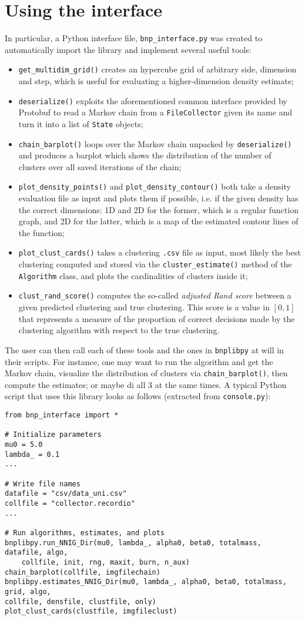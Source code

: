 \section{Using the interface}
In particular, a Python interface file, \verb|bnp_interface.py| was created to automatically import the library and implement several useful tools:
\begin{itemize}
	\item \verb|get_multidim_grid()| creates an hypercube grid of arbitrary side, dimension and step, which is useful for evaluating a higher-dimension density estimate;
	\item \verb|deserialize()| exploits the aforementioned common interface provided by Protobuf to read a Markov chain from a \verb|FileCollector| given its name and turn it into a list of \verb|State| objects;
	\item \verb|chain_barplot()| loops over the Markov chain unpacked by \verb|deserialize()| and produces a barplot which shows the distribution of the number of clusters over all saved iterations of the chain;
	\item \verb|plot_density_points()| and \verb|plot_density_contour()| both take a density evaluation file as input and plots them if possible, i.e. if the given density has the correct dimensions: 1D and 2D for the former, which is a regular function graph, and 2D for the latter, which is a map of the estimated contour lines of the function;
	\item \verb|plot_clust_cards()| takes a clustering \verb|.csv| file as input, most likely the best clustering computed and stored via the \verb|cluster_estimate()| method of the \verb|Algorithm| class, and plots the cardinalities of clusters inside it;
	\item \verb|clust_rand_score()| computes the so-called \emph{adjusted Rand score} between a given predicted clustering and true clustering. This score is a value in $[0,1]$ that represents a measure of the proportion of correct decisions made by the clustering algorithm with respect to the true clustering.
\end{itemize}
The user can then call each of these tools and the ones in \verb|bnplibpy| at will in their scripts.
For instance, one may want to run the algorithm and get the Markov chain, visualize the distribution of clusters via \verb|chain_barplot()|, then compute the estimates; or maybe di all 3 at the same times.
A typical Python script that uses this library looks as follows (extracted from \verb|console.py|):
\begin{verbatim}
from bnp_interface import *

# Initialize parameters
mu0 = 5.0
lambda_ = 0.1
...

# Write file names
datafile = "csv/data_uni.csv"
collfile = "collector.recordio"
...

# Run algorithms, estimates, and plots
bnplibpy.run_NNIG_Dir(mu0, lambda_, alpha0, beta0, totalmass, datafile, algo,
    collfile, init, rng, maxit, burn, n_aux)
chain_barplot(collfile, imgfilechain)
bnplibpy.estimates_NNIG_Dir(mu0, lambda_, alpha0, beta0, totalmass, grid, algo,
collfile, densfile, clustfile, only)
plot_clust_cards(clustfile, imgfileclust)
\end{verbatim}
